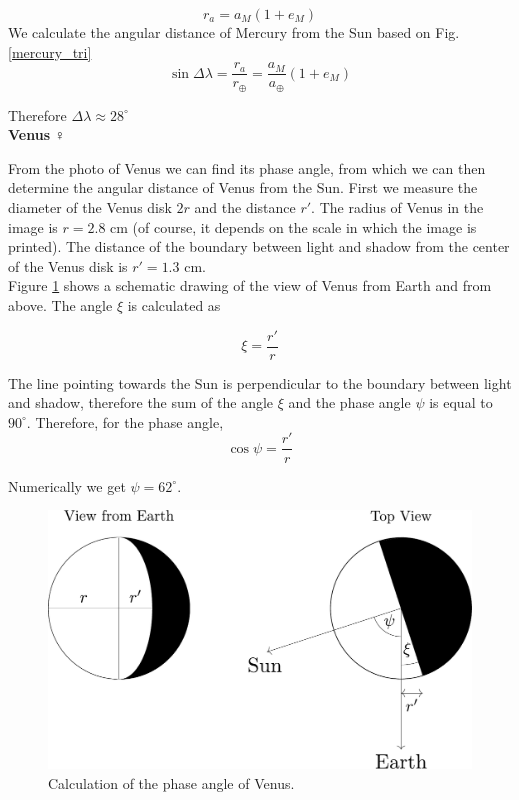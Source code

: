 \documentclass[a4paper,12pt]{extarticle}
\begin{document}
\begin{sol}
	\[r_a=a_M(1+e_M)\]
	We calculate the angular distance of Mercury from the Sun based on Fig. \ref{mercury_tri}
	\[\sin\Delta \lambda =\frac{r_a}{r_\oplus}=\frac{a_M}{a_\oplus}(1+e_M)\]
	
	Therefore $\Delta \lambda\approx
	28^\circ$\\
	
	\textbf{Venus} $\Venus$
	
	\begin{multicols}{2}
	
	From the photo of Venus we can find its phase angle, from which we can then determine the angular distance of Venus from the Sun. First we measure the diameter of the Venus disk $2r$ and the distance $r'$. The radius of Venus in the image is $r = 2.8$ cm (of course, it depends on the scale in which the image is printed). The distance of the boundary between light and shadow from the center of the Venus disk is $r'=1.3$ cm.\\
	
	Figure \ref{venus2} shows a schematic drawing of the view of Venus from Earth and from above. The angle $\xi$ is calculated as
	
	\[\xi=\frac{r'}{r}\]
	
	The line pointing towards the Sun is perpendicular to the boundary between light and shadow, therefore the sum of the angle $\xi$ and the phase angle $\psi$ is equal to $90^\circ$. Therefore, for the phase angle,
	\[\cos\psi=\frac{r'}{r}\]
	
	Numerically we get $\psi= 62^\circ$.
	
\begin{figure}[H]
	\centering
	\includegraphics[width=\linewidth]{venus_pos1.pdf}
	\caption{Calculation of the phase angle of Venus.}
	\label{venus2}
\end{figure}


\end{multicols}
\end{sol}
\end{document}
